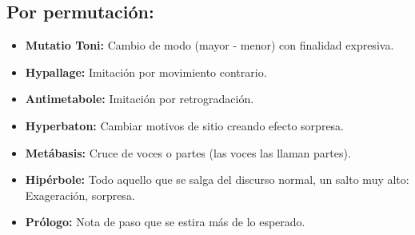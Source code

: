 \documentclass[11pt,a4paper]{article}
\begin{document}
			\subsection{Por permutación:}
				\begin{itemize}
					\item \textbf{Mutatio Toni:} Cambio de modo (mayor - menor) con finalidad expresiva.
					\item \textbf{Hypallage:} Imitación por movimiento contrario.
					\item \textbf{Antimetabole:} Imitación por retrogradación.
					\item \textbf{Hyperbaton:} Cambiar motivos de sitio creando efecto sorpresa.
					\item \textbf{Metábasis:} Cruce de voces o partes (las voces las llaman partes).
					\item \textbf{Hipérbole:} Todo aquello que se salga del discurso normal, un salto muy alto: Exageración, sorpresa.
					\item \textbf{Prólogo:} Nota de paso que se estira más de lo esperado.
				\end{itemize}
\end{document}

